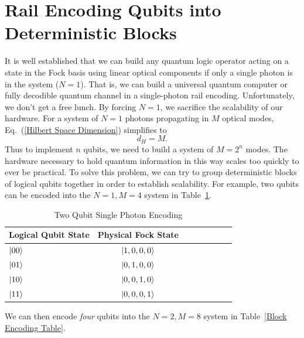 \documentclass[aps,pra,twocolumn,showpacs,superscriptaddress,floatfix,10pt]{revtex4}
\begin{document}
\section{Rail Encoding Qubits into Deterministic Blocks}
\label{Section Block Encoding}
It is well established that we can build any quantum logic operator acting on a state in the Fock basis using linear optical components if only a single photon is in the system ($N=1$). That is, we can build a universal quantum computer or fully decodible quantum channel in a single-photon rail encoding. Unfortunately, we don't get a free lunch. By forcing $N=1$, we sacrifice the scalability of our hardware. For a system of $N=1$ photons propagating in $M$ optical modes, Eq.~(\ref{Hilbert Space Dimension}) simplifies to
\begin{equation}
d_H = M.
\end{equation}
Thus to implement $n$ qubits, we need to build a system of $M=2^n$ modes. The hardware necessary to hold quantum information in this way scales too quickly to ever be practical. To solve this problem, we can try to group deterministic blocks of logical qubits together in order to establish scalability. For example, two qubits can be encoded into the $N=1,M=4$ system in Table~\ref{Two Qubit Encoding Table}.
\begin {table}[h]
\begin{center}
	\begin{tabular}{l*{6}{c}r} 
		Logical Qubit State      \quad \quad \quad     & Physical Fock State \\
		\hline 
		\quad \quad \quad $\ket{00}$     & $\ket{1,0,0,0}$ \\
		\quad \quad \quad $\ket{01}$            & $\ket{0,1,0,0}$ \\
		\quad \quad \quad $\ket{10}$            & $\ket{0,0,1,0}$ \\
		\quad \quad \quad $\ket{11}$            & $\ket{0,0,0,1}$ \\
	\end{tabular}
	\caption{ \label{Two Qubit Encoding Table} Two Qubit Single Photon Encoding}
\end{center}
\end{table}
We can then encode \textit{four} qubits into the $N=2,M=8$ system in Table~\ref{Block Encoding Table}.
\end{document}
